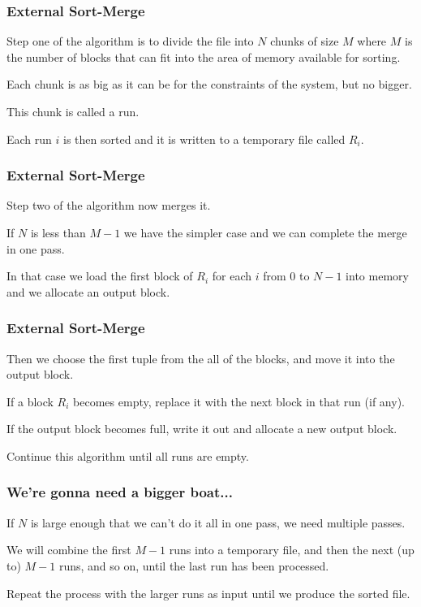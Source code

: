 \begin{frame}
\frametitle{External Sort-Merge}

Step one of the algorithm is to divide the file into $N$ chunks of size $M$ where $M$ is the number of blocks that can fit into the area of memory available for sorting.

Each chunk is as big as it can be for the constraints of the system, but no bigger.

This chunk is called a \alert{run}. 

Each run $i$ is then sorted and it is written to a temporary file called $R_{i}$.


\end{frame}

\begin{frame}
\frametitle{External Sort-Merge}
Step two of the algorithm now merges it. 

If $N$ is less than $M-1$ we have the simpler case and we can complete the merge in one pass. 

In that case we load the first block of $R_{i}$ for each $i$ from $0$ to $N-1$ into memory and we allocate an output block. 

\end{frame}

\begin{frame}
\frametitle{External Sort-Merge}

Then we choose the first tuple from the all of the blocks, and move it into the output block. 

If a block $R_{i}$ becomes empty, replace it with the next block in that run (if any).

 If the output block becomes full, write it out and allocate a new output block. 
 
 Continue this algorithm until all runs are empty. 

\end{frame}


\begin{frame}
\frametitle{We're gonna need a bigger boat...}

If $N$ is large enough that we can't do it all in one pass, we need multiple passes. 

We will combine the first $M-1$ runs into a temporary file, and then the next (up to) $M-1$ runs, and so on, until the last run has been processed. 

Repeat the process with the larger runs as input until we produce the sorted file.

\end{frame}

